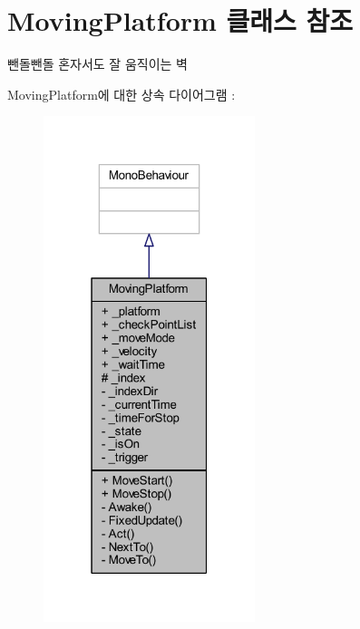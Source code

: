 \hypertarget{class_moving_platform}{}\section{Moving\+Platform 클래스 참조}
\label{class_moving_platform}


뺀돌뺀돌 혼자서도 잘 움직이는 벽  




Moving\+Platform에 대한 상속 다이어그램 \+: \nopagebreak
\begin{figure}[H]
\begin{center}
\leavevmode
\includegraphics[width=175pt]{d8/ddd/class_moving_platform__inherit__graph}
\end{center}
\end{figure}


